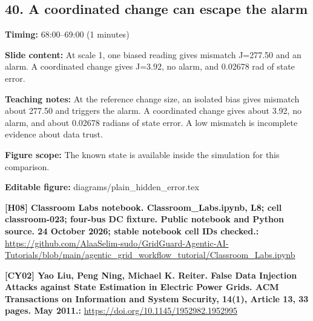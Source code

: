 \documentclass[10pt,letterpaper]{article}
\begin{document}
\subsection*{40. A coordinated change can escape the alarm}
\textbf{Timing:} 68:00--69:00 (1 minutes)\par
\textbf{Slide content:} At scale 1, one biased reading gives mismatch J=277.50 and an alarm.
A coordinated change gives J=3.92, no alarm, and 0.02678 rad of state error.\par
\textbf{Teaching notes:} At the reference change size, an isolated bias gives mismatch about 277.50 and triggers the alarm. A coordinated change gives about 3.92, no alarm, and about 0.02678 radians of state error. A low mismatch is incomplete evidence about data trust.\par
\textbf{Figure scope:} The known state is available inside the simulation for this comparison.\par
\textbf{Editable figure:} diagrams/plain\_hidden\_error.tex\par
\textbf{[H08] Classroom Labs notebook. Classroom\_Labs.ipynb, L8; cell classroom-023; four-bus DC fixture. Public notebook and Python source. 24 October 2026; stable notebook cell IDs checked.:} \href{https://github.com/AlaaSelim-sudo/GridGuard-Agentic-AI-Tutorials/blob/main/agentic_grid_workflow_tutorial/Classroom_Labs.ipynb}{\small\ttfamily https:/\allowbreak{}/\allowbreak{}github.\allowbreak{}com/\allowbreak{}AlaaSelim-\allowbreak{}sudo/\allowbreak{}GridGuard-\allowbreak{}Agentic-\allowbreak{}AI-\allowbreak{}Tutorials/\allowbreak{}blob/\allowbreak{}main/\allowbreak{}agentic\_\allowbreak{}grid\_\allowbreak{}workflow\_\allowbreak{}tutorial/\allowbreak{}Classroom\_\allowbreak{}Labs.\allowbreak{}ipynb}\par
\textbf{[CY02] Yao Liu, Peng Ning, Michael K. Reiter. False Data Injection Attacks against State Estimation in Electric Power Grids. ACM Transactions on Information and System Security, 14(1), Article 13, 33 pages. May 2011.:} \href{https://doi.org/10.1145/1952982.1952995}{\small\ttfamily https:/\allowbreak{}/\allowbreak{}doi.\allowbreak{}org/\allowbreak{}10.\allowbreak{}1145/\allowbreak{}1952982.\allowbreak{}1952995}\par
\par\medskip
\end{document}
